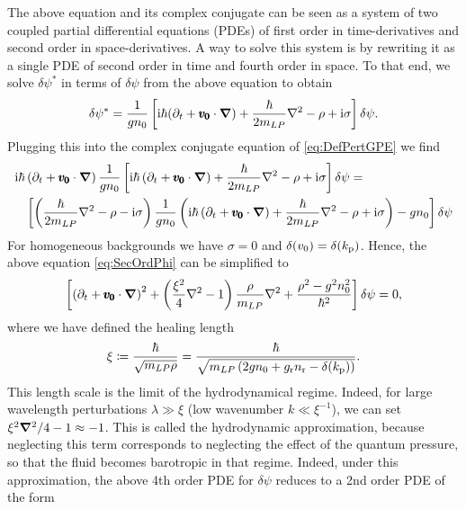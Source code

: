 The above equation and its complex conjugate can be seen as a system of two coupled partial differential equations (PDEs) of first order in time-derivatives and second order in space-derivatives. A way to solve this system is by rewriting it as a single PDE of second order in time and fourth order in space. To that end, we solve $\delta \psi^*$ in terms of $\delta \psi$ from the above equation to obtain
\begin{equation}
    \delta \psi^*=\frac{1}{g n_0}\left[\mathrm{i} \hbar (\partial_t+\pmb{v_0}\cdot{\boldsymbol{\nabla}})+\frac{\hbar}{2m_{LP}}\nabla^2-\rho+\mathrm{i}\sigma\right]\delta \psi.
    \label{eq:hydropsi_conj}
\end{equation}
Plugging this into the complex conjugate equation of \eqref{eq:DefPertGPE} we find
\begin{equation}
\begin{split}
    \mathrm{i} \hbar &\left(\partial_t+\pmb{v_0}\cdot{\boldsymbol{\nabla}}\right)\frac{1}{g n_0}\left[\mathrm{i} \hbar \left(\partial_t+\pmb{v_0}\cdot{\boldsymbol{\nabla}}\right)+\frac{\hbar}{2m_{LP}}\nabla^2-\rho+\mathrm{i}\sigma\right]\delta \psi=\\
    &\left[\left(\frac{\hbar}{2m_{LP}}\nabla^2-\rho-\mathrm{i}\sigma\right)\frac{1}{g n_0}\left(\mathrm{i} \hbar \left(\partial_t+\pmb{v_0}\cdot{\boldsymbol{\nabla}}\right)+\frac{\hbar}{2m_{LP}}\nabla^2-\rho+\mathrm{i}\sigma\right)-g n_0\right] \delta \psi
\end{split}
    \label{eq:SecOrdPhi}
\end{equation}
For homogeneous backgrounds we have $\sigma=0$ and $\delta(v_0)=\delta(k_{\mathrm{p}})$. Hence, the above equation \eqref{eq:SecOrdPhi} can be simplified to
\begin{equation}
    \left[\left(\partial_t+\pmb{v_0}\cdot{\boldsymbol{\nabla}}\right)^2+\left(\frac{\xi^2}{4}\nabla^2-1\right)\frac{\rho}{m_{LP}}\nabla^2+\frac{\rho^2-g^2n_0^2}{\hbar^2}\right]\delta \psi=0,
\end{equation}
where we have defined the healing length
\begin{equation}
    \xi\coloneqq\frac{\hbar}{\sqrt{m_{LP}\rho}}=\frac{\hbar}{\sqrt{m_{LP}\left(2gn_0+g_{\rm r}n_{\rm r}-\delta(k_{\mathrm{p}})\right)}}.
\end{equation}
This length scale is the limit of the hydrodynamical regime. Indeed, for large wavelength perturbations $\lambda\gg\xi$ (low wavenumber $k\ll\xi^{-1}$), we can set  ${\xi^2}\boldsymbol{\nabla}^2/4-1\approx-1$. This is called the hydrodynamic approximation, because neglecting this term corresponds to neglecting the effect of the quantum pressure, so that the fluid becomes barotropic in that regime. Indeed,
under this approximation, the above 4th order PDE for $\delta \psi$ reduces to a 2nd order PDE of the form
